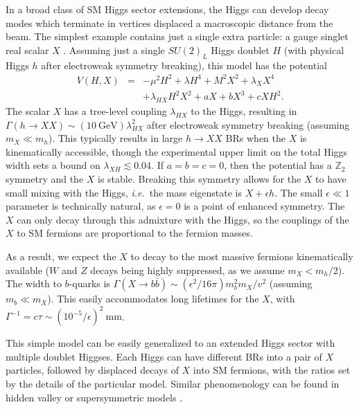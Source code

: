 \documentclass[aps,prl,twocolumn,preprintnumbers,groupedaddress,nofootinbib]{revtex4}
\begin{document}
In a broad class of SM Higgs sector extensions, the Higgs can develop decay modes which terminate in vertices displaced a macroscopic distance from the beam. The simplest example contains just a single extra particle: a gauge singlet real scalar $X$ \cite{Strassler:2006ri}. Assuming just a single $SU(2)_L$ Higgs doublet $H$ (with physical Higgs $h$ after electroweak symmetry breaking), this model has the potential 
\begin{eqnarray}
V(H,X) & = & - \mu^2 H^2+\lambda H^4+M^2 X^2 + \lambda_X X^4  \\
& & + \lambda_{HX} H^2X^2+aX+bX^3+cXH^2. \nonumber
\end{eqnarray}
The scalar $X$ has a tree-level coupling $\lambda_{HX}$ to the Higgs, resulting in $\Gamma(h \to XX) \sim (10~\mbox{GeV})\lambda_{HX}^2$ after electroweak symmetry breaking (assuming $m_X \ll m_h$). This typically results in large $h\to XX$ BRs when the $X$ is kinematically accessible, though the experimental upper limit on the total Higgs width \cite{CMS:2014ala} sets a bound on $\lambda_{XH} \lesssim 0.04$. If $a=b=c=0$, then the potential has a $\mathbb{Z}_2$ symmetry and the $X$ is stable. Breaking this symmetry allows for the $X$ to have small mixing with the Higgs, {\it i.e.}~the mass eigenstate is $X+\epsilon h$. The small $\epsilon \ll 1$ parameter is technically natural, as $\epsilon = 0$ is a point of enhanced symmetry. The $X$ can only decay through this admixture with the Higgs, so the couplings of the $X$ to SM fermions are proportional to the fermion masses. 

As a result, we expect the $X$ to decay to the most massive fermions kinematically available ($W$ and $Z$ decays being highly suppressed, as we assume $m_X < m_h/2$). The width to $b$-quarks is $\Gamma(X\to b\bar{b}) \sim (\epsilon^2/16\pi)m_b^2 m_X/v^2$ (assuming $m_b \ll m_X$). This easily accommodates long lifetimes for the $X$, with $\Gamma^{-1} = c\tau \sim (10^{-5}/\epsilon)^{2}~\mbox{mm}$. 

This simple model can be easily generalized to an extended Higgs sector with multiple doublet Higgses. Each Higgs can have different BRs into a pair of $X$ particles, followed by displaced decays of $X$ into SM fermions, with the ratios set by the details of the particular model. Similar phenomenology can be found in hidden valley \cite{Strassler:2006im} or supersymmetric models \cite{Graham:2012th}.
\end{document}
